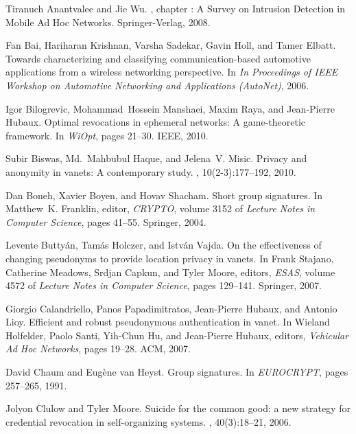 \documentclass[conference]{IEEEtran}[10pt]
\begin{document}

\begin{thebibliography}{10}

Tiranuch Anantvalee and Jie Wu.
, chapter : A Survey on
  Intrusion Detection in Mobile Ad Hoc Networks.
\newblock Springer-Verlag, 2008.

Fan Bai, Hariharan Krishnan, Varsha Sadekar, Gavin Holl, and Tamer Elbatt.
\newblock Towards characterizing and classifying communication-based automotive
  applications from a wireless networking perspective.
\newblock In {\em In Proceedings of IEEE Workshop on Automotive Networking and
  Applications (AutoNet)}, 2006.

Igor Bilogrevic, Mohammad~Hossein Manshaei, Maxim Raya, and Jean-Pierre Hubaux.
\newblock Optimal revocations in ephemeral networks: A game-theoretic
  framework.
\newblock In {\em WiOpt}, pages 21--30. IEEE, 2010.

Subir Biswas, Md.~Mahbubul Haque, and Jelena~V. Misic.
\newblock Privacy and anonymity in vanets: A contemporary study.
, 10(2-3):177--192, 2010.

Dan Boneh, Xavier Boyen, and Hovav Shacham.
\newblock Short group signatures.
\newblock In Matthew~K. Franklin, editor, {\em CRYPTO}, volume 3152 of {\em
  Lecture Notes in Computer Science}, pages 41--55. Springer, 2004.

Levente Butty{\'a}n, Tam{\'a}s Holczer, and Istv{\'a}n Vajda.
\newblock On the effectiveness of changing pseudonyms to provide location
  privacy in vanets.
\newblock In Frank Stajano, Catherine Meadows, Srdjan Capkun, and Tyler Moore,
  editors, {\em ESAS}, volume 4572 of {\em Lecture Notes in Computer Science},
  pages 129--141. Springer, 2007.

Giorgio Calandriello, Panos Papadimitratos, Jean-Pierre Hubaux, and Antonio
  Lioy.
\newblock Efficient and robust pseudonymous authentication in vanet.
\newblock In Wieland Holfelder, Paolo Santi, Yih-Chun Hu, and Jean-Pierre
  Hubaux, editors, {\em Vehicular Ad Hoc Networks}, pages 19--28. ACM, 2007.

David Chaum and Eug{\`e}ne van Heyst.
\newblock Group signatures.
\newblock In {\em EUROCRYPT}, pages 257--265, 1991.

Jolyon Clulow and Tyler Moore.
\newblock Suicide for the common good: a new strategy for credential revocation
  in self-organizing systems.
, 40(3):18--21, 2006.


\end{thebibliography}
\end{document}
